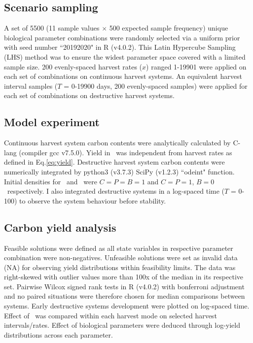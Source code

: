 \documentclass[../thesis.tex]{subfiles} %
\begin{document}
\subsection{Scenario sampling}
A set of 5500 (11 sample values $\times$ 500 expected sample frequency) unique biological parameter combinations were randomly selected via a uniform prior with seed number ``20192020" in R (v4.0.2).  This Latin Hypercube Sampling (LHS) method was to ensure the widest parameter space covered with a limited sample size.  200 evenly-spaced harvest rates ($x$) ranged 1-19901 \dayU were applied on each set of combinations on continuous harvest systems.  An equivalent harvest interval samples ($T$ = 0-19900 days, 200 evenly-spaced samples) were applied for each set of combinations on destructive harvest systems.

\subsection{Model experiment}
Continuous harvest system carbon contents were analytically calculated by C-lang (compiler gcc v7.5.0). Yield in \PoH\ was independent from harvest rates as defined in Eq.\ref{eq:yield}.  Destructive harvest system carbon contents were numerically integrated by python3 (v3.7.3) SciPy (v1.2.3) ``odeint" function.  Initial densities for \PBN\ and \PoN\ were $C=P=B=1$ and $C=P=1$, $B=0$ \den\ respectively.  I also integrated destructive systems in a log-spaced time ($T$ = 0-100) to observe the system behaviour before stability.

\subsection{Carbon yield analysis}
Feasible solutions were defined as all state variables in respective parameter combination were non-negatives.  Unfeasible solutions were set as invalid data (NA) for observing yield distributions within feasibility limits.  The data was right-skewed with outlier values more than 100x of the median in its respective set.  Pairwise Wilcox signed rank tests in R (v4.0.2) with bonferroni adjustment and no paired situations were therefore chosen for median comparisons between systems.  Early destructive systems development were plotted on log-spaced time.  Effect of \bac\ was compared within each harvest mode on selected harvest intervals/rates.  Effect of biological parameters were deduced through log-yield distributions across each parameter.
\end{document}
